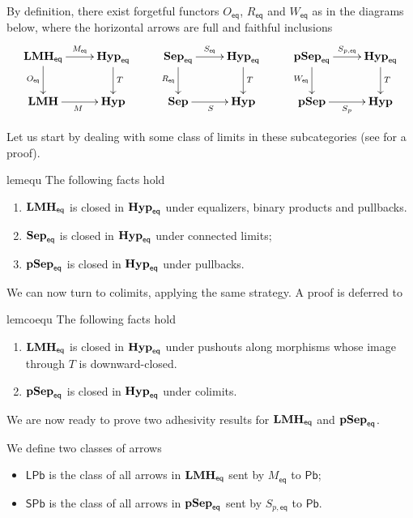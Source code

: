 \documentclass[3p]{elsarticle}
\newcommand{\pbc}{\mathsf{Pb}}
\newcommand{\pbl}{\mathsf{LPb}}
\newcommand{\pbs}{\mathsf{SPb}}
\newcommand{\eq}{\mathsf{eq}}
\newcommand{\catname}[1]{\textbf{\textup{#1}}}
\newcommand{\lmo}{\catname{LMH}}
\newcommand{\hyp}{\catname{Hyp}}
\newcommand{\pshyp}{\catname{pSep}}
\newcommand{\shyp}{\catname{Sep}}
\newcommand{\EqHyp}{\catname{Hyp}_{\mathsf{eq}}} %
\newcommand{\EqsHyp}{\catname{Sep}_{\mathsf{eq}}}
\newcommand{\EqpsHyp}{\catname{pSep}_{\mathsf{eq}}}
\newcommand{\Eqlmo}{\catname{LMH}_{\mathsf{eq}}}
\theoremstyle{remark}
\theoremstyle{definition}
\begin{document}
\begin{rem}\label{rem:obv1}
By definition, there exist forgetful functors $O_{\eq}$, $R_{\eq}$ and $W_{\eq}$ as in the diagrams below, where the horizontal arrows are full and faithful inclusions
\[\xymatrix{\Eqlmo \ar[r]^-{M_{\mathsf{eq}}} \ar[d]_{O_{\mathsf{eq}}}& \EqHyp\ar[d]^{T} & \EqsHyp \ar[r]^-{S_{\mathsf{eq}}} \ar[d]_{R_{\mathsf{eq}}} & \EqHyp \ar[d]^{T} & \EqpsHyp \ar[r]^-{S_{p, \mathsf{eq}}} \ar[d]_{W_{\mathsf{eq}}} & \EqHyp\ar[d]^{T}\\ \lmo \ar[r]_{M} & \hyp & \shyp \ar[r]_{S} & \hyp  & \pshyp \ar[r]_-{S_p}& \hyp}\]
	
\end{rem}

Let us start by dealing with some class of limits in these subcategories (see  for a proof).

\begin{restatable}{lem}{equ}\label{lem:equ} The following facts hold
	\begin{enumerate}
		\item 	$\Eqlmo$ is closed in $\EqHyp$ under equalizers, binary products and pullbacks.
		\item $\EqsHyp$ is closed in $\EqHyp$ under connected limits; 
		\item $\EqpsHyp$ is closed in $\EqHyp$ under pullbacks.
	\end{enumerate}
\end{restatable}

We can now turn to colimits, applying the same strategy. A proof is deferred to 

\begin{restatable}{lem}{coequ}\label{lem:coequ}
 The following facts hold
\begin{enumerate}
	\item 	$\Eqlmo$ is closed in $\EqHyp$ under pushouts along morphisms whose image through $T$ is downward-closed.
	\item $\EqpsHyp$ is closed in $\EqHyp$ under colimits.
\end{enumerate}
\end{restatable}

We are now ready to prove two adhesivity results for $\Eqlmo$ and $\EqpsHyp$.

\begin{defi}We define two classes of arrows
\begin{itemize}
	\item $\pbl$ is the class of all arrows in $\Eqlmo$ sent by $M_{\eq}$ to $\pbc$;
	\item $\pbs$ is the class of all arrows in $\EqpsHyp$ sent by $S_{p,\eq}$ to $\pbc$.
\end{itemize}
\end{defi}
\end{document}
